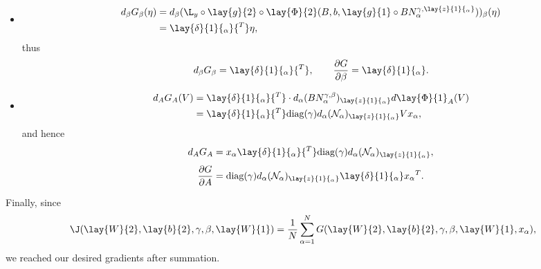 \begin{itemize}
	\item \begin{align*}
		d_\beta G_\beta(\eta)&=d_\beta(\L_y\circ\lay{g}{2}\circ\lay{\Phi}{2}(B,b,\lay{g}{1}\circ BN_\alpha^{\gamma,\lay{z}{1}{_\alpha}}))_\beta(\eta)\\
		&=\lay{\delta}{1}{_\alpha}{^T}\eta,
	\end{align*}
	thus
	$$d_\beta G_\beta=\lay{\delta}{1}{_\alpha}{^T},\qquad\frac{\partial G}{\partial\beta}=\lay{\delta}{1}{_\alpha}.$$
	
	\item \begin{align*}
		d_AG_A(V)&=\lay{\delta}{1}{_\alpha}{^T}\cdot d_\alpha (BN_\alpha^{\gamma,\beta})_{\lay{z}{1}{_\alpha}}d\lay{\Phi}{1}_A(V)\\
		&=\lay{\delta}{1}{_\alpha}{^T}\diag(\gamma) d_\alpha(\mathcal{N}_\alpha)_{\lay{z}{1}{_\alpha}}Vx_\alpha,
	\end{align*}
	and hence
	$$d_AG_A=x_\alpha\lay{\delta}{1}{_\alpha}{^T}\diag(\gamma)d_\alpha(\mathcal{N}_\alpha)_{\lay{z}{1}{_\alpha}},$$
	$$\frac{\partial G}{\partial A}=\diag(\gamma)d_\alpha(\mathcal{N}_\alpha)_{\lay{z}{1}{_\alpha}}\lay{\delta}{1}{_\alpha}x_\alpha{^T}.$$
\end{itemize}

Finally, since
$$\J(\lay{W}{2},\lay{b}{2},\gamma,\beta,\lay{W}{1})=\frac{1}{N}\sum_{\alpha=1}^NG(\lay{W}{2},\lay{b}{2},\gamma,\beta,\lay{W}{1},x_\alpha),$$
we reached our desired gradients after summation.







